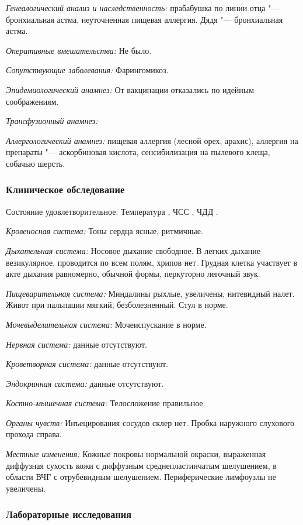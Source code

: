 \documentclass[a4paper,14pt]{extarticle}
\newcommand{\oCelsius}{\tcdegree{}C}
\newcommand{\bpm}{уд/мин}
\newcommand{\mpm}{/мин}
\begin{document}
\emph{Генеалогический анализ и наследственность:} прабабушка по линии отца "--- бронхиальная астма, неуточненная пищевая аллергия. Дядя "--- бронхиальная астма.

\emph{Оперативные вмешательства:} Не было.

\emph{Сопутствующие заболевания:} Фарингомикоз.

\emph{Эпидемиологический анамнез:} От вакцинации отказались по идейным соображениям.

\emph{Трансфузионный анамнез:}

\emph{Аллергологический анамнез:} пищевая аллергия (лесной орех, арахис), аллергия на препараты "--- аскорбиновая кислота, сенсибилизация на пылевого клеща, собачью шерсть.

\subsubsection*{Клиническое обследование}

Состояние удовлетворительное. Температура \numprint[\oCelsius]{36.6}, ЧСС \numprint[\bpm]{95}, ЧДД \numprint[\mpm]{23}.

\emph{Кровеносная система:} Тоны сердца ясные, ритмичные.

\emph{Дыхательная система:} Носовое дыхание свободное. В легких дыхание везикулярное, проводится по всем полям, хрипов нет. Грудная клетка участвует в акте дыхания равномерно, обычной формы, перкуторно легочный звук.

\emph{Пищеварительная система:} Миндалины рыхлые, увеличены, нитевидный налет. Живот при пальпации мягкий, безболезненный. Стул в норме.

\emph{Мочевыделительная система:} Мочеиспускание в норме.

\emph{Нервная система:} данные отсутствуют.

\emph{Кроветворная система:} данные отсутствуют.

\emph{Эндокринная система:} данные отсутствуют.

\emph{Костно-мышечная система:} Телосложение правильное.

\emph{Органы чувств:} Инъецирования сосудов склер нет. Пробка наружного слухового прохода справа.

\emph{Местные изменения:} Кожные покровы нормальной окраски, выраженная диффузная сухость кожи с диффузным среднепластинчатым шелушением, в области ВЧГ с отрубевидным шелушением. Периферические лимфоузлы не увеличены.

\subsubsection*{Лабораторные исследования}
\end{document}
